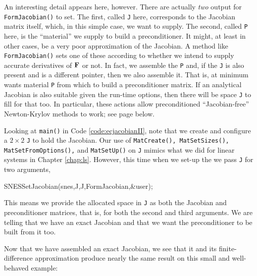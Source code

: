 
An interesting detail appears here, however.  There are actually \emph{two} output \pMats for \texttt{FormJacobian()} to set.  The first, called \texttt{J} here, corresponds to the Jacobian matrix itself, which, in this simple case, we want to supply.  The second, called \texttt{P} here, is the ``material'' we supply to build a preconditioner.  It might, at least in other cases, be a very poor approximation of the Jacobian.  A method like \texttt{FormJacobian()} sets one of these \pMats according to whether we intend to supply accurate derivatives of $\mathbf{F}$ or not.  In fact, we assemble the \pMat \texttt{P} and, if the \pMat \texttt{J} is also present and is a different pointer, then we also assemble it.  That is, at minimum \PETSc wants material \texttt{P} from which to build a preconditioner matrix.  If an analytical Jacobian is also suitable given the run-time options, then there will be space \texttt{J} to fill for that too.  In particular, these actions allow preconditioned ``Jacobian-free'' Newton-Krylov methods to work; see page \pageref{sec:JFNK} below.

Looking at \texttt{main()} in Code \ref{code:ecjacobianII}, note that we create and configure a $2\times 2$ \pMat \texttt{J} to hold the Jacobian.  Our use of \texttt{MatCreate(), MatSetSizes(), MatSetFromOptions(),} and \texttt{MatSetUp()} on \texttt{J} mimics what we did for linear systems in Chapter \ref{chap:ls}.  However, this time when we set-up the \pSNES we pass \texttt{J} for two arguments,
\begin{code}
SNESSetJacobian(snes,J,J,FormJacobian,&user);
\end{code}
This means we provide the allocated space in \texttt{J} as both the Jacobian and preconditioner matrices, that is, for both the second and third \pMat arguments.  We are telling \PETSc that we have an exact Jacobian and that we want the preconditioner to be built from it too.

Now that we have assembled an exact Jacobian, we see that it and its finite-difference approximation produce nearly the same result on this small and well-behaved example:

